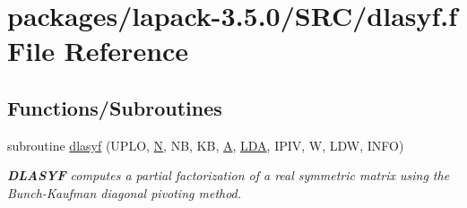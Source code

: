 \hypertarget{dlasyf_8f}{}\section{packages/lapack-\/3.5.0/\+S\+R\+C/dlasyf.f File Reference}
\label{dlasyf_8f}
\subsection*{Functions/\+Subroutines}
\begin{DoxyCompactItemize}
\item 
subroutine \hyperlink{group__doubleSYcomputational_gab8741cc9f86971d18aac2edf68fe0854}{dlasyf} (U\+P\+L\+O, \hyperlink{polmisc_8c_a0240ac851181b84ac374872dc5434ee4}{N}, N\+B, K\+B, \hyperlink{classA}{A}, \hyperlink{example__user_8c_ae946da542ce0db94dced19b2ecefd1aa}{L\+D\+A}, I\+P\+I\+V, W, L\+D\+W, I\+N\+F\+O)
\begin{DoxyCompactList}\small\item\em {\bfseries D\+L\+A\+S\+Y\+F} computes a partial factorization of a real symmetric matrix using the Bunch-\/\+Kaufman diagonal pivoting method. \end{DoxyCompactList}\end{DoxyCompactItemize}

